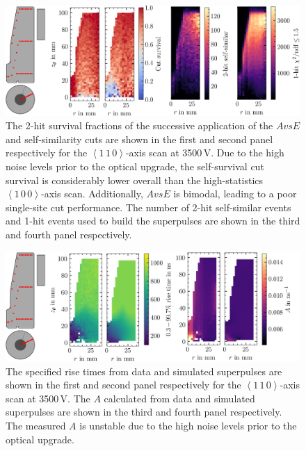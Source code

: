 \begin{figure}[H]
    \centering
    \includegraphics[width=6in]{figs/library/slow_axis_nhits.png}
    \caption{The 2-hit survival fractions of the successive application of the $AvsE$ and self-similarity cuts are shown in the first and second panel respectively for the $\left<1\,1\,0\right>$-axis scan at 3500\,V. Due to the high noise levels prior to the optical upgrade, the self-survival cut survival is considerably lower overall than the high-statistics $\left<1\,0\,0\right>$-axis scan. Additionally, $AvsE$ is bimodal, leading to a poor single-site cut performance. The number of 2-hit self-similar events and 1-hit events used to build the superpulses are shown in the third and fourth panel respectively.}
	\label{fig:slow_axis_nhits}
\end{figure}
\begin{figure}[H]
    \centering
    \includegraphics[width=6in]{figs/library/slow_axis_dt_aoe.png}
    \caption{The specified rise times from data and simulated superpulses are shown in the first and second panel respectively for the $\left<1\,1\,0\right>$-axis scan at 3500\,V. The $A$ calculated from data and simulated superpulses are shown in the third and fourth panel respectively. The measured $A$ is unstable due to the high noise levels prior to the optical upgrade.}
	\label{fig:dt_aoe_slow_axis}
\end{figure}

